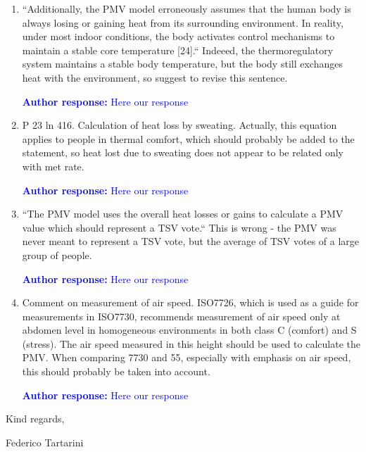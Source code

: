 \documentclass[a4paper, 10pt]{letter}
\newcommand{\response}[1]{\textcolor{blue}{\textbf{Author response:} #1}}
\begin{document}
\begin{letter}
\begin{enumerate}
            \item ``Additionally, the PMV model erroneously assumes that the human body is always losing or gaining heat from its surrounding environment.
            In reality, under most indoor conditions, the body activates control mechanisms to maintain a stable core temperature [24].`` Indeeed, the thermoregulatory system maintains a stable body temperature, but the body still exchanges heat with the environment, so suggest to revise this sentence.

            \response{Here our response}

            \item P 23 ln 416.
            Calculation of heat loss by sweating.
            Actually, this equation applies to people in thermal comfort, which should probably be added to the statement, so heat lost due to sweating does not appear to be related only with met rate.

            \response{Here our response}

            \item ``The PMV model uses the overall heat losses or gains to calculate a PMV value which should represent a TSV vote.`` This is wrong - the PMV was never meant to represent a TSV vote, but the average of TSV votes of a large group of people.

            \response{Here our response}

            \item Comment on measurement of air speed.
            ISO7726, which is used as a guide for measurements in ISO7730, recommends measurement of air speed only at abdomen level in homogeneous environments in both class C (comfort) and S (stress).
            The air speed measured in this height should be used to calculate the PMV\@.
            When comparing 7730 and 55, especially with emphasis on air speed, this should probably be taken into account.

            \response{Here our response}

        \end{enumerate}

        Kind regards,

        \vspace*{5px}

        Federico Tartarini

    \end{letter}
\end{document}
